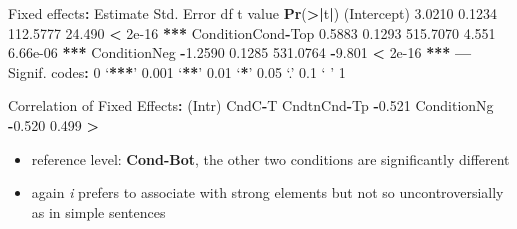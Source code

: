\documentclass[ignorenonframetext,]{beamer}
\newenvironment{Shaded}{\begin{snugshade}}{\end{snugshade}}
\newcommand{\KeywordTok}[1]{\textcolor[rgb]{0.13,0.29,0.53}{\textbf{#1}}}
\newcommand{\DecValTok}[1]{\textcolor[rgb]{0.00,0.00,0.81}{#1}}
\newcommand{\FloatTok}[1]{\textcolor[rgb]{0.00,0.00,0.81}{#1}}
\newcommand{\StringTok}[1]{\textcolor[rgb]{0.31,0.60,0.02}{#1}}
\newcommand{\OperatorTok}[1]{\textcolor[rgb]{0.81,0.36,0.00}{\textbf{#1}}}
\newcommand{\ErrorTok}[1]{\textcolor[rgb]{0.64,0.00,0.00}{\textbf{#1}}}
\newcommand{\NormalTok}[1]{#1}
\providecommand{\tightlist}{%
  \setlength{\itemsep}{0pt}\setlength{\parskip}{0pt}}
\newcommand{\cond}[1]{\textbf{#1}}
\begin{document}
\begin{frame}[fragile]

\tiny

\begin{Shaded}
\begin{Highlighting}[]
\NormalTok{Fixed effects}\OperatorTok{:}
\StringTok{                  }\NormalTok{Estimate Std. Error       df t value }\KeywordTok{Pr}\NormalTok{(}\OperatorTok{>}\ErrorTok{|}\NormalTok{t}\OperatorTok{|}\NormalTok{)    }
\NormalTok{(Intercept)         }\FloatTok{3.0210}     \FloatTok{0.1234} \FloatTok{112.5777}  \FloatTok{24.490}  \OperatorTok{<}\StringTok{ }\FloatTok{2e-16} \OperatorTok{**}\ErrorTok{*}
\NormalTok{ConditionCond}\OperatorTok{-}\NormalTok{Top   }\FloatTok{0.5883}     \FloatTok{0.1293} \FloatTok{515.7070}   \FloatTok{4.551} \FloatTok{6.66e-06} \OperatorTok{**}\ErrorTok{*}
\NormalTok{ConditionNeg       }\OperatorTok{-}\FloatTok{1.2590}     \FloatTok{0.1285} \FloatTok{531.0764}  \OperatorTok{-}\FloatTok{9.801}  \OperatorTok{<}\StringTok{ }\FloatTok{2e-16} \OperatorTok{**}\ErrorTok{*}
\OperatorTok{---}
\NormalTok{Signif. codes}\OperatorTok{:}\StringTok{  }\DecValTok{0}\NormalTok{ ‘}\OperatorTok{**}\ErrorTok{*}\NormalTok{’ }\FloatTok{0.001}\NormalTok{ ‘}\OperatorTok{**}\NormalTok{’ }\FloatTok{0.01}\NormalTok{ ‘}\OperatorTok{*}\NormalTok{’ }\FloatTok{0.05}\NormalTok{ ‘.’ }\FloatTok{0.1}\NormalTok{ ‘ ’ }\DecValTok{1}

\NormalTok{Correlation of Fixed Effects}\OperatorTok{:}
\StringTok{            }\NormalTok{(Intr) CndC}\OperatorTok{-}\NormalTok{T}
\NormalTok{CndtnCnd}\OperatorTok{-}\NormalTok{Tp }\OperatorTok{-}\FloatTok{0.521}       
\NormalTok{ConditionNg }\OperatorTok{-}\FloatTok{0.520}  \FloatTok{0.499}
\OperatorTok{>}\StringTok{ }
\end{Highlighting}
\end{Shaded}

\normalsize

\begin{itemize}
\tightlist
\item
  reference level: \cond{Cond-Bot}, the other two conditions are
  significantly different
\item
  again \emph{i} prefers to associate with strong elements but not so
  uncontroversially as in simple sentences
\end{itemize}

\end{frame}
\end{document}
